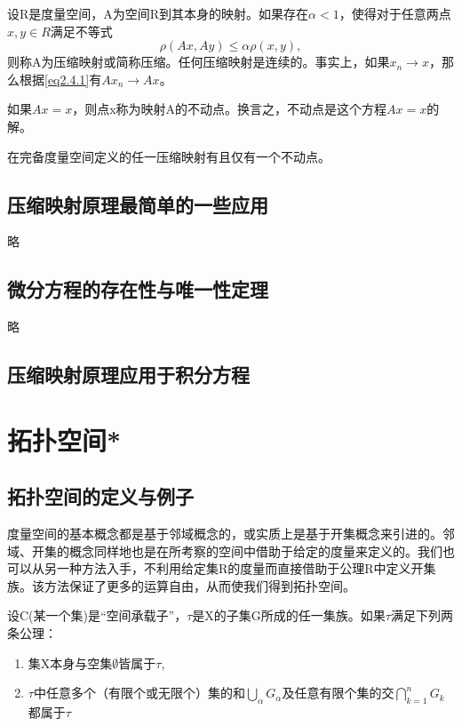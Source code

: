 设R是度量空间，A为空间R到其本身的映射。如果存在$\alpha<1$，使得对于任意两点$x,y\in R$满足不等式
\begin{equation}
\label{eq2.4.1}
\rho(Ax,Ay) \leqslant \alpha\rho(x,y),
\end{equation}
则称A为压缩映射或简称压缩。任何压缩映射是连续的。事实上，如果$x_n\rightarrow x$，那么根据\cref{eq2.4.1}有$Ax_n\rightarrow Ax$。

如果$Ax=x$，则点x称为映射A的\textcolor[rgb]{1,0,0}{不动点}。换言之，不动点是这个方程$Ax=x$的解。

\begin{theorem}[压缩映射原理]
	\label{th2.4.1}
	在完备度量空间定义的任一压缩映射\textcolor[rgb]{1,0,0}{有且仅有一个不动点}。
\end{theorem}
\subsection{压缩映射原理最简单的一些应用}
略
\subsection{微分方程的存在性与唯一性定理}
略
\subsection{压缩映射原理应用于积分方程}

\section{拓扑空间*}
\subsection{拓扑空间的定义与例子}
度量空间的基本概念都是基于邻域概念的，或实质上是基于开集概念来引进的。邻域、开集的概念同样地也是在所考察的空间中借助于给定的度量来定义的。我们也可以从另一种方法入手，不利用给定集R的度量而直接借助于公理R中定义开集族。该方法保证了更多的运算自由，从而使我们得到拓扑空间。
\begin{definition}
	\label{def2.5.1}
	设C(某一个集)是“空间承载子”，$\tau$是X的子集G所成的任一集族。如果$\tau$满足下列两条公理：
	\begin{enumerate}
		\item 集X本身与空集$\emptyset$皆属于$\tau$,
		\item $\tau$中任意多个（有限个或无限个）集的和$\bigcup\limits_{\alpha} G_{\alpha}$及任意有限个集的交$\bigcap\limits_{k=1}^nG_k$都属于$\tau$
	\end{enumerate}
\end{definition}


